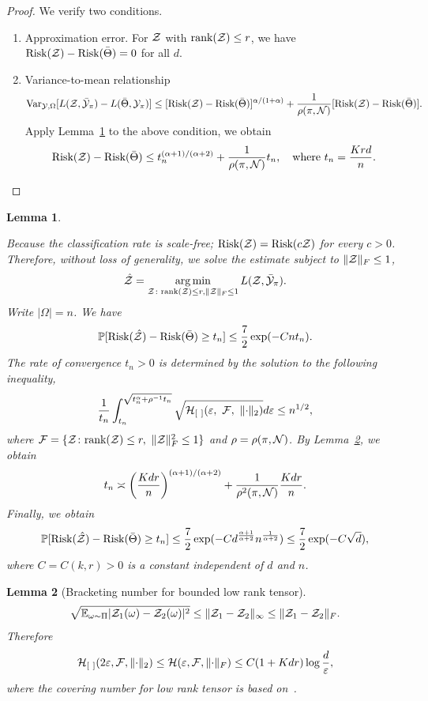 \documentclass{article}
\theoremstyle{plain}
\newtheorem{lem}{Lemma}
\theoremstyle{definition}
\begin{document}
\clearpage
\begingroup
\let\clearpage\relax 
\onecolumn 
\begin{proof}
We verify two conditions. 
\begin{enumerate}
\item Approximation error. For $\mathcal{Z}$ with $\text{rank}(\mathcal{Z})\leq r$, we have $\textup{Risk}(\mathcal{Z})-\textup{Risk}(\bar \Theta)=0$ for all $d$.  
\item Variance-to-mean relationship
\[
\text{Var}_{\mathcal{Y}, \Omega}[L(\mathcal{Z},\bar {\mathcal{Y}}_\pi)-L(\bar \Theta, \mathcal{Y}_\pi)]\leq [\textup{Risk}(\mathcal{Z})-\textup{Risk}(\bar \Theta)]^{\alpha/(1+\alpha)}+{1\over \rho(\pi, \mathcal{N})}[\textup{Risk}(\mathcal{Z})-\textup{Risk}(\bar \Theta)].
\]
Apply Lemma~\ref{lem:tensor} to the above condition, we obtain
\[
\textup{Risk}(\mathcal{Z})-\textup{Risk}(\bar \Theta)\leq t_n^{(\alpha+1)/(\alpha+2)}+{1\over \rho(\pi, \mathcal{N})}t_n, \quad \text{where }t_n={Krd\over n}.
\]
\end{enumerate}
\end{proof}

\begin{lem}\label{lem:tensor}

Because the classification rate is scale-free; $\text{Risk}(\mathcal{Z})=\text{Risk}(c\mathcal{Z})$ for every $c>0$. Therefore, without loss of generality, we solve the estimate subject to $\lVert\mathcal{Z}\rVert_F\leq 1$,
\[
\hat {\mathcal{Z}}=\operatorname*{arg\,min}_{\mathcal{Z}\colon \textup{rank}(\mathcal{Z})\leq r, \lVert\mathcal{Z}\rVert_F\leq 1}L(\mathcal{Z},\bar {\mathcal{Y}}_\pi).
\]
Write $|\Omega|=n$. We have
\[
\mathbb{P}[\textup{Risk}(\hat {\mathcal{Z}})-\textup{Risk}(\bar \Theta)\geq t_n]\leq {7\over 2}\exp(-Cnt_n).
\]
The rate of convergence $t_n>0$ is determined by the solution to the following inequality,
\[
{1\over t_n}\int^{\sqrt{t_n^\alpha+\rho^{-1}t_n}}_{t_n} \sqrt{\tH_{[\ ]}(\varepsilon,\ \tF,\ \vnormSize{}{\cdot}) }d\varepsilon \leq n^{1/2}, 
\]
where $\mathcal{F}=\{\mathcal{Z}\colon \textup{rank}(\mathcal{Z})\leq r, \ \lVert\mathcal{Z}\rVert_F^2\leq 1\}$ and $\rho=\rho(\pi, \mathcal{N})$. By Lemma~\ref{lem:bracketing}, we obtain 
\[
t_n\asymp \left({Kdr\over n}\right)^{(\alpha+1)/(\alpha+2)} +{1\over \rho^2(\pi, \mathcal{N})} {Kdr\over n}.
\] 
Finally, we obtain
\[
\mathbb{P}[\textup{Risk}(\hat {\mathcal{Z}})-\textup{Risk}(\bar \Theta)\geq t_n]\leq {7\over 2}\exp(-Cd^{\alpha+1\over \alpha+2}n^{1\over \alpha+2}) \leq {7\over 2}\exp(-C\sqrt{d}),
\]
where $C=C(k,r)>0$ is a constant independent of $d$ and $n$.  
\end{lem}

\begin{lem}[Bracketing number for bounded low rank tensor]\label{lem:bracketing}
\[
\sqrt{\mathbb{E}_{\omega\sim \Pi}|\mathcal{Z}_1(\omega)-\mathcal{Z}_2(\omega)|^2} \leq \lVert\mathcal{Z}_1-\mathcal{Z}_2\rVert_\infty \leq \lVert\mathcal{Z}_1-\mathcal{Z}_2\rVert_F.
\]
Therefore
\[
\mathcal{H}_{[\ ]}(2\varepsilon, \mathcal{F}, \lVert\cdot\rVert_2)\leq \mathcal{H}(\varepsilon, \mathcal{F}, \lVert\cdot\rVert_F) \leq C{(1+Kdr)\log {d\over \varepsilon}},
\]
where the covering number for low rank tensor is based on~\citep{mu2014square,9119759}.
\end{lem}

\endgroup






\appendix
\end{document}
